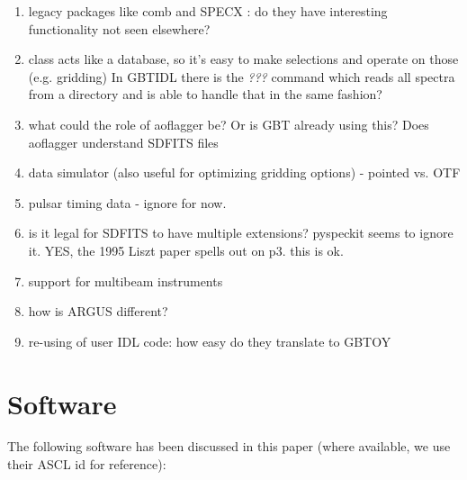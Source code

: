 \documentclass[12pt,a4paper]{article}
\begin{document}
\begin{enumerate}

\item legacy packages like comb and SPECX : do they have interesting functionality not seen elsewhere?

\item class acts like a database, so it's easy to make selections and operate on those (e.g. gridding)
  In GBTIDL there is the {\it ???} command which reads all spectra from a directory and is able
  to handle that in the same fashion?

\item   what could the role of aoflagger \cite{offringa-2012-morph-rfi-algorithm} be? Or is GBT already
  using this? Does aoflagger understand SDFITS files

\item  data simulator (also useful for optimizing gridding options) - pointed vs. OTF

\item pulsar timing data - ignore for now.

\item is it legal for SDFITS to have multiple extensions?  pyspeckit seems to ignore it.
  YES, the 1995 Liszt paper spells out on p3. this is ok.

\item support for multibeam instruments

\item how is ARGUS different?

\item re-using of user IDL code: how easy do they translate to GBTOY  
  
  
\end{enumerate}

\section{Software}

The following software has been discussed in this paper (where available, we use their ASCL id for reference):
\end{document}

